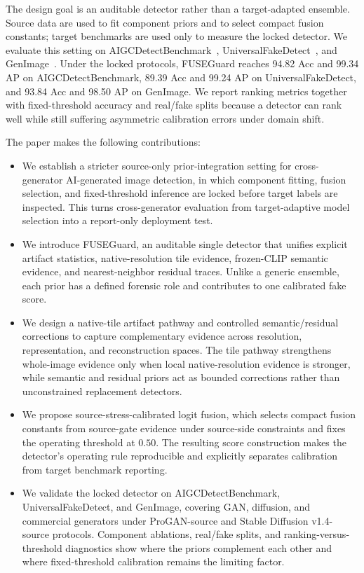 \documentclass[lettersize,journal]{IEEEtran}
\begin{document}
The design goal is an auditable detector rather than a target-adapted ensemble. Source data are used to fit component priors and to select compact fusion constants; target benchmarks are used only to measure the locked detector. We evaluate this setting on AIGCDetectBenchmark~\cite{zhong2023patchcraft}, UniversalFakeDetect~\cite{ojha2023univfd}, and GenImage~\cite{zhu2023genimage}. Under the locked protocols, FUSEGuard reaches 94.82 Acc and 99.34 AP on AIGCDetectBenchmark, 89.39 Acc and 99.24 AP on UniversalFakeDetect, and 93.84 Acc and 98.50 AP on GenImage. We report ranking metrics together with fixed-threshold accuracy and real/fake splits because a detector can rank well while still suffering asymmetric calibration errors under domain shift.

The paper makes the following contributions:
\begin{itemize}
    \item We establish a stricter source-only prior-integration setting for cross-generator AI-generated image detection, in which component fitting, fusion selection, and fixed-threshold inference are locked before target labels are inspected. This turns cross-generator evaluation from target-adaptive model selection into a report-only deployment test.
    \item We introduce FUSEGuard, an auditable single detector that unifies explicit artifact statistics, native-resolution tile evidence, frozen-CLIP semantic evidence, and nearest-neighbor residual traces. Unlike a generic ensemble, each prior has a defined forensic role and contributes to one calibrated fake score.
    \item We design a native-tile artifact pathway and controlled semantic/residual corrections to capture complementary evidence across resolution, representation, and reconstruction spaces. The tile pathway strengthens whole-image evidence only when local native-resolution evidence is stronger, while semantic and residual priors act as bounded corrections rather than unconstrained replacement detectors.
    \item We propose source-stress-calibrated logit fusion, which selects compact fusion constants from source-gate evidence under source-side constraints and fixes the operating threshold at $0.50$. The resulting score construction makes the detector's operating rule reproducible and explicitly separates calibration from target benchmark reporting.
    \item We validate the locked detector on AIGCDetectBenchmark, UniversalFakeDetect, and GenImage, covering GAN, diffusion, and commercial generators under ProGAN-source and Stable Diffusion v1.4-source protocols. Component ablations, real/fake splits, and ranking-versus-threshold diagnostics show where the priors complement each other and where fixed-threshold calibration remains the limiting factor.
\end{itemize}
\end{document}

